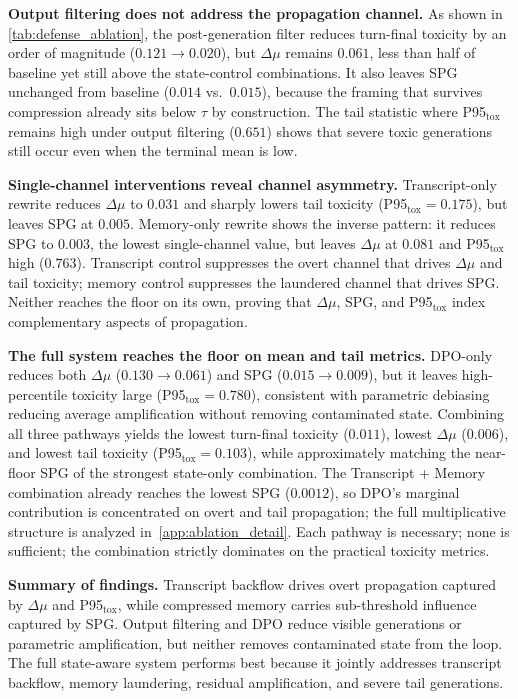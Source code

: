 \noindent \textbf{Output filtering does not address the propagation channel.} As shown in \cref{tab:defense_ablation}, the post-generation filter reduces turn-final toxicity by an order of magnitude ($0.121 \to 0.020$), but $\Delta\mu$ remains $0.061$, less than half of baseline yet still above the state-control combinations. It also leaves SPG unchanged from baseline ($0.014$ vs.\ $0.015$), because the framing that survives compression already sits below $\tau$ by construction. The tail statistic where P95$_{\text{tox}}$ remains high under output filtering ($0.651$) shows that severe toxic generations still occur even when the terminal mean is low.

\noindent \textbf{Single-channel interventions reveal channel asymmetry.} Transcript-only rewrite reduces $\Delta\mu$ to $0.031$ and sharply lowers tail toxicity (P95$_{\text{tox}}=0.175$), but leaves SPG at $0.005$. Memory-only rewrite shows the inverse pattern: it reduces SPG to $0.003$, the lowest single-channel value, but leaves $\Delta\mu$ at $0.081$ and P95$_{\text{tox}}$ high ($0.763$). Transcript control suppresses the overt channel that drives $\Delta\mu$ and tail toxicity; memory control suppresses the laundered channel that drives SPG. Neither reaches the floor on its own, proving that $\Delta\mu$, SPG, and P95$_{\text{tox}}$ index complementary aspects of propagation.

\noindent \textbf{The full system reaches the floor on mean and tail metrics.} DPO-only reduces both $\Delta\mu$ ($0.130 \to 0.061$) and SPG ($0.015 \to 0.009$), but it leaves high-percentile toxicity large (P95$_{\text{tox}}=0.780$), consistent with parametric debiasing reducing average amplification without removing contaminated state. Combining all three pathways yields the lowest turn-final toxicity ($0.011$), lowest $\Delta\mu$ ($0.006$), and lowest tail toxicity (P95$_{\text{tox}}=0.103$), while approximately matching the near-floor SPG of the strongest state-only combination. The Transcript + Memory combination already reaches the lowest SPG ($0.0012$), so DPO's marginal contribution is concentrated on overt and tail propagation; the full multiplicative structure is analyzed in~\cref{app:ablation_detail}. Each pathway is necessary; none is sufficient; the combination strictly dominates on the practical toxicity metrics.

\noindent \textbf{Summary of findings.}
Transcript backflow drives overt propagation captured by $\Delta\mu$ and P95$_{\text{tox}}$, while compressed memory carries sub-threshold influence captured by SPG. Output filtering and DPO reduce visible generations or parametric amplification, but neither removes contaminated state from the loop. The full state-aware system performs best because it jointly addresses transcript backflow, memory laundering, residual amplification, and severe tail generations.
